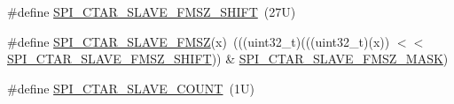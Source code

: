 \begin{DoxyCompactItemize}
\item 
\#define \mbox{\hyperlink{group___s_p_i___register___masks_gaf8ee524100dedae1cc3afb60643b2475}{S\+P\+I\+\_\+\+C\+T\+A\+R\+\_\+\+S\+L\+A\+V\+E\+\_\+\+F\+M\+S\+Z\+\_\+\+S\+H\+I\+FT}}~(27\+U)
\item 
\#define \mbox{\hyperlink{group___s_p_i___register___masks_ga20fc13a457a7df6331fdfdcbbc89c972}{S\+P\+I\+\_\+\+C\+T\+A\+R\+\_\+\+S\+L\+A\+V\+E\+\_\+\+F\+M\+SZ}}(x)~(((uint32\+\_\+t)(((uint32\+\_\+t)(x)) $<$$<$ \mbox{\hyperlink{group___s_p_i___register___masks_gaf8ee524100dedae1cc3afb60643b2475}{S\+P\+I\+\_\+\+C\+T\+A\+R\+\_\+\+S\+L\+A\+V\+E\+\_\+\+F\+M\+S\+Z\+\_\+\+S\+H\+I\+FT}})) \& \mbox{\hyperlink{group___s_p_i___register___masks_ga5230074b3809e2ef525e87fdca078717}{S\+P\+I\+\_\+\+C\+T\+A\+R\+\_\+\+S\+L\+A\+V\+E\+\_\+\+F\+M\+S\+Z\+\_\+\+M\+A\+SK}})
\item 
\#define \mbox{\hyperlink{group___s_p_i___register___masks_ga0f2d4d476832545d05a60d1f54871be2}{S\+P\+I\+\_\+\+C\+T\+A\+R\+\_\+\+S\+L\+A\+V\+E\+\_\+\+C\+O\+U\+NT}}~(1\+U)
\end{DoxyCompactItemize}
